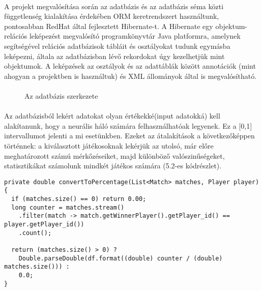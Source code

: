 \paragraph{}
A projekt megvalósítása során az adatbázis és az adatbázis séma közti függetlenség kialakítása érdekében ORM keretrendszert használtunk, pontosabban RedHat által fejlesztett Hibernate-t. A Hibernate egy objektum-relációs leképezést megvalósító programkönyvtár Java platformra, amelynek segítségével relációs adatbázisok tábláit és osztályokat tudunk egymásba leképezni, általa az adatbázisban lévő rekordokat úgy kezelhetjük mint objektumok. A leképzések az osztályok és az adattáblák között annotációk (mint ahogyan a projektben is használtuk) és XML állományok által is megvalósítható. 

\paragraph{}
\begin{figure}[t]
  \centering
  \caption[Az adatbázis]%
  { Az adatbázis szerkezete }
  \label{fig:ALAP:sm1}
\end{figure}
\paragraph{}
Az adatbázisból lekért adatokat olyan értékekké(input adatokká) kell alakítanunk, hogy a neurális háló számára felhasználhatóak legyenek. Ez a [0,1] intervallumot jelenti a mi esetünkben. Ezeket az átalakítások a következőképpen történnek: a kiválasztott játékosoknak lekérjük az utolsó, már előre meghatározott számú mérkőzéseiket, majd különböző valószinűségeket, statisztikákat számolunk mindkét játékos számára (5.2-es kódrészlet).

\begin{lstlisting}[caption= Egy játékos utolsó mérkőzéseinek győzelmi rátája]
private double convertToPercentage(List<Match> matches, Player player){
  if (matches.size() == 0) return 0.00;
  long counter = matches.stream()
    .filter(match -> match.getWinnerPlayer().getPlayer_id() == player.getPlayer_id())
    .count();

  return (matches.size() > 0) ? 
    Double.parseDouble(df.format((double) counter / (double) matches.size())) : 
    0.0;
}
\end{lstlisting}

